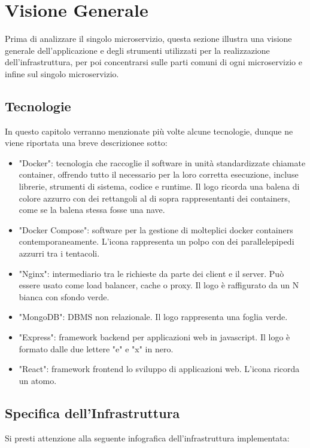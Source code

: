 \documentclass{report}
\begin{document}
\section{Visione Generale}
Prima di analizzare il singolo microservizio, questa sezione illustra una visione generale dell'applicazione e degli strumenti utilizzati per la realizzazione dell'infrastruttura, per poi concentrarsi sulle parti comuni di ogni microservizio e infine sul singolo microservizio.

\subsection{Tecnologie}

In questo capitolo verranno menzionate più volte alcune tecnologie, dunque ne viene riportata una breve descrizionee sotto:
\begin{itemize}
	\item "Docker": tecnologia che raccoglie il software in unità standardizzate chiamate container, offrendo tutto il necessario per la loro corretta esecuzione, incluse librerie, strumenti di sistema, codice e runtime. Il logo ricorda una balena di colore azzurro con dei rettangoli al di sopra rappresentanti dei containers, come se la balena stessa fosse una nave.
	\item "Docker Compose": software per la gestione di molteplici docker containers contemporaneamente. L'icona rappresenta un polpo con dei parallelepipedi azzurri tra i tentacoli.
	\item "Nginx": intermediario tra le richieste da parte dei client e il server. Può essere usato come load balancer, cache o proxy. Il logo è raffigurato da un N bianca con sfondo verde.
	\item "MongoDB": DBMS non relazionale. Il logo rappresenta una foglia verde.
	\item "Express": framework backend per applicazioni web in javascript. Il logo è formato dalle due lettere "e" e "x" in nero.
	\item "React": framework frontend lo sviluppo di applicazioni web. L'icona ricorda un atomo.
\end{itemize}

\subsection{Specifica dell'Infrastruttura}

Si presti attenzione alla seguente infografica dell'infrastruttura implementata:
\end{document}
